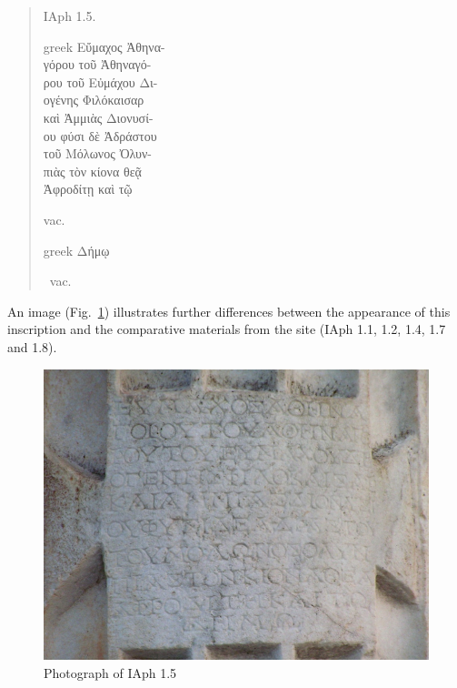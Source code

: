\documentclass[amsthm,ebook]{saparticle}
\begin{document}
\begin{quotation}
\noindent IAph 1.5.\\
\begin{otherlanguage*}{greek}
\noindent Εὔμαχος Ἀθηνα-\\
γόρου τοῦ Ἀθηναγό-\\
ρου τοῦ Εὐμάχου Δι-\\
ογένης Φιλόκαισαρ\\
 καὶ Ἀμμιὰς Διονυσί-\\
ου φύσι δὲ Ἀδράστου\\
τοῦ Μόλωνος Ὀλυν-\\
πιὰς τὸν κίονα θεᾷ\\
Ἀφροδίτῃ καὶ τῷ
\end{otherlanguage*}
vac. \begin{otherlanguage*}{greek}
Δήμῳ
\end{otherlanguage*} vac.
\end{quotation}

An image (Fig.~\ref{fig:3}) illustrates further differences between the appearance of this inscription
and the comparative materials from the site (IAph 1.1, 1.2, 1.4, 1.7 and 1.8). 




\begin{figure}[!bp]
\centering
 \includegraphics[width=\columnwidth]{PaperproposalforEAGLEfinal-img003.jpg}
\caption{Photograph of IAph 1.5}
\label{fig:3}
\end{figure}
\end{document}
